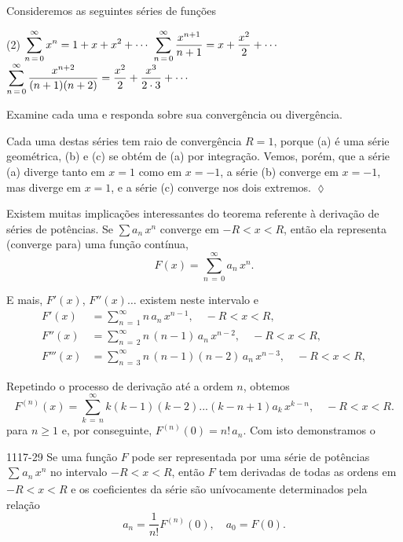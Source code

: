 \begin{exer}
Consideremos as seguintes séries de funções
\begin{tasks}[label=(\alph*),label-width=4ex,item-indent=2cm,ref=(\alph*)](2)
\task \(\displaystyle{\sum_{n\,=\, 0}^{\infty}x^n=1+x+x^2+\cdots}\)
\task \(\displaystyle{\sum_{n\, =\, 0}^{\infty}\dfrac{x^{n+1}}{n+1}=x+\dfrac{x^2}{2}+\cdots}\)
\task \(\displaystyle{\sum_{n\, =\, 0}^{\infty}\dfrac{x^{n+2}}{(n+1)(n+2)}=
\dfrac{x^2}{2}+\dfrac{x^3}{2\cdot3}+\cdots}\)
\end{tasks}

Examine cada uma e responda sobre sua convergência ou divergência.
\end{exer}

\solo Cada uma destas séries tem raio de convergência $R = 1$,
porque (a) é uma série geométrica, (b) e (c) se obtém de (a) por
integração. Vemos, porém, que a série (a) diverge tanto em $x = 1$
como em $x=-1$, a série (b) converge em $x=-1$, mas diverge em $x
= 1$, e a série (c) converge nos dois extremos. \hfill \(\lozenge\)


Existem muitas implicações interessantes do teorema referente à  derivação de séries de 
potências. Se $\sum a_n\,x^n$ converge em $- R < x < R$, então ela representa 
(converge para) uma função contínua,
\begin{equation*}
  F(x) = \sum_{n\, =\, 0}^{\infty}a_n\,x^n.
\end{equation*}

E mais, $F'(x)$, \(F''(x)\ldots\) existem neste intervalo e
\begin{align*}
F'(x) &= \sum_{n\,=\,1}^{\infty}n\,a_{n}\,x^{n-1},\quad  -R < x < R,\\[2ex]
F''(x) &= \sum_{n\,=\,2}^{\infty}n\,(n-1)\,a_{n}\,x^{n-2},\quad  -R < x < R,\\[2ex]
F'''(x) &= \sum_{n\,=\,3}^{\infty}n\,(n-1)(n-2)\,a_{n}\,x^{n-3},\quad  -R < x < R,
\end{align*}

Repetindo o processo de derivação até a ordem \(n\), obtemos
\begin{equation*}
F^{(n)}(x) =\sum_{k\,=\, n}^{\infty} k(k - 1)(k - 2) ... (k - n + 1)a_k\,x^{k-n},\quad 
-R < x < R.
\end{equation*}
para $n\ge 1$  e, por conseguinte, $F^{(n)}(0)=n!\,a_n$. Com isto
demonstramos o

\begin{theoc}{}{1117-29}
Se uma função $F$ pode ser representada por uma série de potências
 $\sum_{}a_n\,x^{n}$ no intervalo $-R < x < R$, então $F$ tem
derivadas de todas as ordens em $- R < x < R$ e os coeficientes da
série são unívocamente determinados pela relação
\begin{equation*}
a_{n} = \dfrac{1}{n!}F^{(n)}(0),\quad  a_{0} = F(0).
\end{equation*}
\end{theoc}

